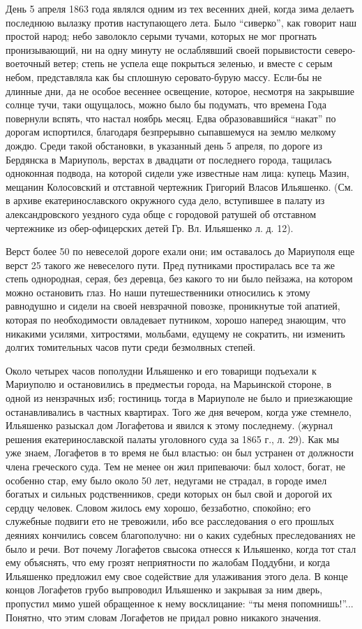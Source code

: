 День 5 апреля 1863 года являлся одним из тех весенних дней, когда зима делаетъ
последнюю вылазку против наступающего лета.  Было ``сиверко'', как говорит наш
простой народ; небо заволокло серыми тучами, которых не мог прогнать
пронизывающий, ни на одну минуту не ослаблявший своей порывистости
северо-воеточный ветер; степь не успела еще покрыться зеленью, и вместе с серым
небом, представляла как бы сплошную серовато-бурую массу. Если-бы не длинные
дни, да не особое весеннее освещение, которое, несмотря на закрывшие солнце
тучи, таки ощущалось, можно было бы подумать, что времена Года повернули
вспять, что настал ноябрь месяц. Едва образовавшийся ``накат'' по дорогам
испортился, благодаря безпрерывно сыпавшемуся на землю мелкому дождю.  Среди
такой обстановки, в указанный день 5 апреля, по дороге из Бердянска в
Мариуполь, верстах в двадцати от последнего города, тащилась одноконная
подвода, на которой сидели уже известные нам лица: купець Мазин, мещанин
Колосовский и отставной чертежник Григорий Власов Ильяшенко. (См. в архиве
екатеринославского окружного суда дело, вступившее в палату из александровского
уездного суда обще с городовой ратушей об отставном чертежнике из
обер-офицерских детей Гр. Вл. Ильяшенко л. д. 12).

Верст более 50 по невеселой дороге ехали они; им оставалось до Мариуполя еще верст 25 такого же невеселого пути. 
Пред путниками простиралась все та же степь
однородная, серая, без деревца, без какого то ни было пейзажа, на котором можно
остановить глаз. Но наши путешественники относились к этому равнодушно и сидели
на своей невзрачной повозке, проникнутые той апатией, которая по необходимости
овладевает путником, хорошо наперед знающим, что никакими усилями, хитростями,
мольбами, едущему не сократить, ни изменить долгих томительных часов пути среди
безмолвных степей.

Около четырех часов пополудни Ильяшенко и его товарищи подъехали к Мариуполю и
остановились в предместьи города, на Марьинской стороне, в одной из нензрачных
изб; гостиниць тогда в Мариуполе не было и приезжающие останавливались в
частных квартирах. Того же дня вечером, когда уже стемнело, Ильяшенко разыскал
дом Логафетова и явился к этому последнему.
(журнал решения екатеринославской палаты уголовного суда за 1865 г., л. 29). Как мы уже знаем, Логафетов в
то время не был властью: он был устранен от должности члена греческого суда. Тем не менее он жил
припеваючи: был холост, богат, не особенно стар, ему
было около 50 лет, недугами не страдал, в городе имел
богатых и сильных родственников, среди которых он
был свой и дорогой их сердцу человек. Словом жилось
ему хорошо, беззаботно, спокойно; его служебные подвиги
ето не тревожили, ибо все расследования о его прошлых деяниях 
кончились совсем благополучно: ни о каких судебных 
преследованиях не было и речи. Вот почему Логафетов свысока отнесся к Ильяшенко, когда тот стал
ему объяснять, что ему грозят неприятности по жалобам
Поддубни, и когда Ильяшенко предложил ему свое содействие для улаживания этого дела. В конце концов
Логафетов грубо выпроводил Ильяшенко и закрывая за ним 
дверь, пропустил мимо ушей обращенное к нему восклицание: ``ты меня попомнишь!''...
Понятно, что этим словам Логафетов не придал ровно никакого значения. 

